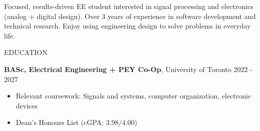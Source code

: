 \documentclass{resume}
\begin{document}
Focused, results-driven EE student interested in signal processing and electronics (analog + digital design). Over 3 years of experience in software development and technical research. Enjoy using engineering design to solve problems in everyday life.

\begin{rSection}{EDUCATION}

   {\bf BASc, Electrical Engineering + PEY Co-Op}, University of Toronto \hfill {2022 - 2027}
   \vspace{-0.2cm}
   \begin{itemize}
    \itemsep -8pt {} 
     \item Relevant coursework: Signals and systems, computer organization, electronic devices
     \item Dean's Honours List (cGPA: 3.98/4.00)
   \end{itemize}



\end{rSection}
\end{document}
